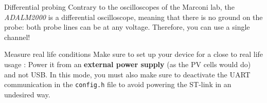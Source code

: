\begin{bclogo}[couleur = gray!20, arrondi = 0.2, logo=\bcinfo]{Differential probing}
        Contrary to the oscilloscopes of the Marconi lab, the
        \textit{ADALM2000} is a differential oscilloscope, meaning that there
        is no ground on the probe: both probe lines can be at any voltage.
        Therefore, you can use a single channel!
\end{bclogo}
\begin{bclogo}[couleur = gray!20, arrondi = 0.2, logo=\bcattention]{Measure real life conditions}
        Make sure to set up your device for a close to real life usage : Power
        it from an \textbf{external power supply} (as the PV cells would do)
        and not USB. In this mode, you must also make sure to deactivate the
        UART communication in the \texttt{config.h} file to avoid powering the
        ST-link in an undesired way.
\end{bclogo}
